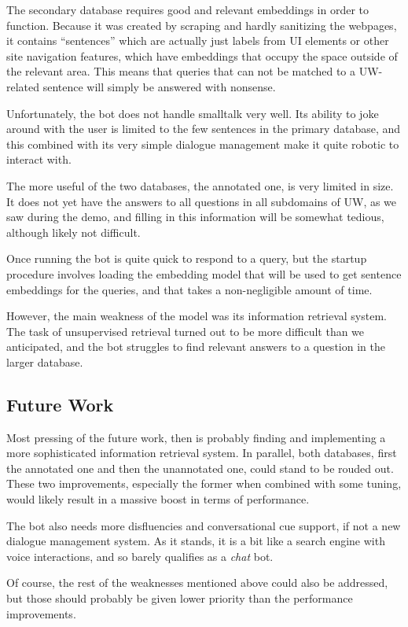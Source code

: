 \documentclass[11pt]{article}
\begin{document}
The secondary database requires good and relevant embeddings in order to function. Because it was created by scraping and hardly sanitizing the webpages, it contains ``sentences'' which are actually just labels from UI elements or other site navigation features, which have embeddings that occupy the space outside of the relevant area. This means that queries that can not be matched to a UW-related sentence will simply be answered with nonsense.

Unfortunately, the bot does not handle smalltalk very well. Its ability to joke around with the user is limited to the few sentences in the primary database, and this combined with its very simple dialogue management make it quite robotic to interact with.

The more useful of the two databases, the annotated one, is very limited in size. It does not yet have the answers to all questions in all subdomains of UW, as we saw during the demo, and filling in this information will be somewhat tedious, although likely not difficult.

Once running the bot is quite quick to respond to a query, but the startup procedure involves loading the embedding model that will be used to get sentence embeddings for the queries, and that takes a non-negligible amount of time.

However, the main weakness of the model was its information retrieval system. The task of unsupervised retrieval turned out to be more difficult than we anticipated, and the bot struggles to find relevant answers to a question in the larger database.

\subsection{Future Work}

Most pressing of the future work, then is probably finding and implementing a more sophisticated information retrieval system. In parallel, both databases, first the annotated one and then the unannotated one, could stand to be rouded out. These two improvements, especially the former when combined with some tuning, would likely result in a massive boost in terms of performance.

The bot also needs more disfluencies and conversational cue support, if not a new dialogue management system. As it stands, it is a bit like a search engine with voice interactions, and so barely qualifies as a \textit{chat} bot.

Of course, the rest of the weaknesses mentioned above could also be addressed, but those should probably be given lower priority than the performance improvements.
\end{document}
